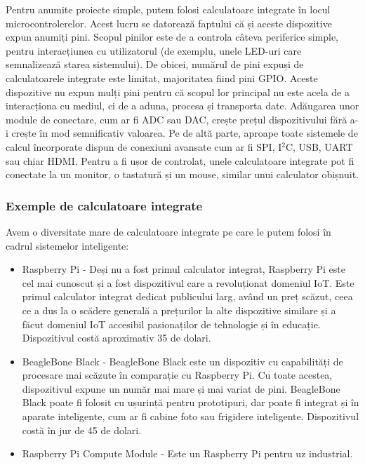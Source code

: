 Pentru anumite proiecte simple, putem folosi calculatoare integrate în locul microcontrolerelor.
Acest lucru se datorează faptului că și aceste dispozitive expun anumiți pini.
Scopul pinilor este de a controla câteva periferice simple, pentru interacțiunea cu utilizatorul (de exemplu, unele LED-uri  care semnalizează starea sistemului).
De obicei, numărul de pini expuși de calculatoarele integrate este limitat, majoritatea fiind pini GPIO.
Aceste dispozitive nu expun mulți pini pentru că scopul lor principal nu este acela de a interacționa cu mediul, ci de a aduna, procesa și transporta date.
Adăugarea unor module de conectare, cum ar fi ADC sau DAC, crește prețul dispozitivului fără a-i crește în mod semnificativ valoarea.
Pe de altă parte, aproape toate sistemele de calcul încorporate dispun de conexiuni avansate cum ar fi SPI, I$^2$C, USB, UART sau chiar HDMI.
Pentru a fi ușor de controlat, unele calculatoare integrate pot fi conectate la un monitor, o tastatură și un mouse, similar unui calculator obișnuit.

\subsubsection{Exemple de calculatoare integrate}
\label{sec:embed:micro-comp:embed:example}

Avem o diversitate mare de calculatoare integrate pe care le putem folosi în cadrul sistemelor inteligente:

\begin{itemize}
  \item Raspberry Pi - Deși nu a fost primul calculator integrat, Raspberry Pi este cel mai cunoscut și a fost dispozitivul care a revoluționat domeniul IoT.
    Este primul calculator integrat dedicat publicului larg, având un preț scăzut, ceea ce a dus la o scădere generală a prețurilor la alte dispozitive similare și a făcut domeniul IoT accesibil pasionaților de tehnologie și în educație.
    Dispozitivul costă aproximativ 35 de dolari.
  \item BeagleBone Black - BeagleBone Black este un dispozitiv cu capabilități de procesare mai scăzute în comparație cu Raspberry Pi.
    Cu toate acestea, dispozitivul expune un număr mai mare și mai variat de pini.
    BeagleBone Black poate fi folosit cu ușurință pentru prototipuri, dar poate fi integrat și în aparate inteligente, cum ar fi cabine foto sau frigidere inteligente.
    Dispozitivul costă în jur de 45 de dolari.
  \item Raspberry Pi Compute Module - Este un Raspberry Pi pentru uz industrial.
\end{itemize}

